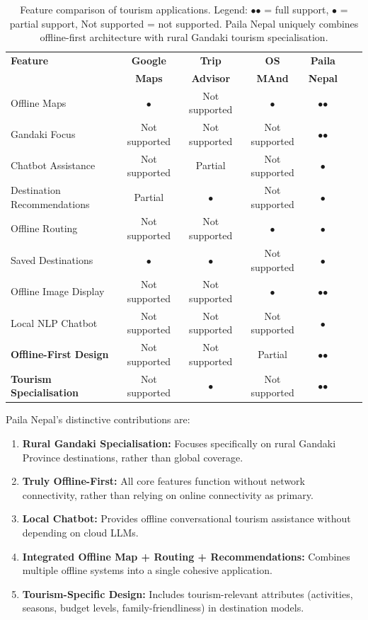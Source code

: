 \documentclass[12pt,a4paper,oneside]{report}
\begin{document}
\begin{table}[h]
\centering
\small
\begin{tabular}{lcccccc}
\toprule
\textbf{Feature} & \textbf{Google} & \textbf{Trip} & \textbf{OS} & \textbf{Paila} \\
& \textbf{Maps} & \textbf{Advisor} & \textbf{MAnd} & \textbf{Nepal} \\
\midrule
Offline Maps & $\bullet$ & Not supported & $\bullet$ & $\bullet$$\bullet$ \\
Gandaki Focus & Not supported & Not supported & Not supported & $\bullet$$\bullet$ \\
Chatbot Assistance & Not supported & Partial & Not supported & $\bullet$ \\
Destination Recommendations & Partial & $\bullet$ & Not supported & $\bullet$ \\
Offline Routing & Not supported & Not supported & $\bullet$ & $\bullet$ \\
Saved Destinations & $\bullet$ & $\bullet$ & Not supported & $\bullet$ \\
Offline Image Display & Not supported & Not supported & $\bullet$ & $\bullet$$\bullet$ \\
Local NLP Chatbot & Not supported & Not supported & Not supported & $\bullet$ \\
\midrule
\textbf{Offline-First Design} & Not supported & Not supported & Partial & $\bullet$$\bullet$ \\
\textbf{Tourism Specialisation} & Not supported & $\bullet$ & Not supported & $\bullet$$\bullet$ \\
\bottomrule
\end{tabular}
\caption{Feature comparison of tourism applications. Legend: $\bullet$$\bullet$ = full support, $\bullet$ = partial support, Not supported = not supported. Paila Nepal uniquely combines offline-first architecture with rural Gandaki tourism specialisation.}
\label{tbl:feature_comparison}
\end{table}

Paila Nepal's distinctive contributions are:

\begin{enumerate}
\item \textbf{Rural Gandaki Specialisation:} Focuses specifically on rural Gandaki Province destinations, rather than global coverage.

\item \textbf{Truly Offline-First:} All core features function without network connectivity, rather than relying on online connectivity as primary.

\item \textbf{Local Chatbot:} Provides offline conversational tourism assistance without depending on cloud LLMs.

\item \textbf{Integrated Offline Map + Routing + Recommendations:} Combines multiple offline systems into a single cohesive application.

\item \textbf{Tourism-Specific Design:} Includes tourism-relevant attributes (activities, seasons, budget levels, family-friendliness) in destination models.
\end{enumerate}
\end{document}
